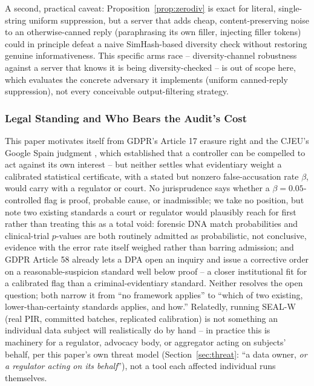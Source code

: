 \documentclass[10pt,journal,compsoc]{IEEEtran}
\begin{document}
A second, practical caveat: Proposition~\ref{prop:zerodiv} is exact for literal, single-string uniform suppression, but a server that adds cheap, content-preserving noise to an otherwise-canned reply (paraphrasing its own filler, injecting filler tokens) could in principle defeat a naive SimHash-based diversity check without restoring genuine informativeness. This specific arms race -- diversity-channel robustness against a server that knows it is being diversity-checked -- is out of scope here, which evaluates the concrete adversary it implements (uniform canned-reply suppression), not every conceivable output-filtering strategy.

\subsubsection{Legal Standing and Who Bears the Audit's Cost}

This paper motivates itself from GDPR's Article 17 erasure right \cite{gdpr2016} and the CJEU's Google Spain judgment \cite{googlespain2014}, which established that a controller can be compelled to act against its own interest -- but neither settles what evidentiary weight a calibrated statistical certificate, with a stated but nonzero false-accusation rate $\beta$, would carry with a regulator or court. No jurisprudence says whether a $\beta{=}0.05$-controlled flag is proof, probable cause, or inadmissible; we take no position, but note two existing standards a court or regulator would plausibly reach for first rather than treating this as a total void: forensic DNA match probabilities and clinical-trial $p$-values are both routinely admitted as probabilistic, not conclusive, evidence with the error rate itself weighed rather than barring admission; and GDPR Article 58 already lets a DPA open an inquiry and issue a corrective order on a reasonable-suspicion standard well below proof -- a closer institutional fit for a calibrated flag than a criminal-evidentiary standard. Neither resolves the open question; both narrow it from ``no framework applies'' to ``which of two existing, lower-than-certainty standards applies, and how.'' Relatedly, running SEAL-W (real PIR, committed batches, replicated calibration) is not something an individual data subject will realistically do by hand -- in practice this is machinery for a regulator, advocacy body, or aggregator acting on subjects' behalf, per this paper's own threat model (Section~\ref{sec:threat}: ``a data owner, \emph{or a regulator acting on its behalf}''), not a tool each affected individual runs themselves.
\end{document}
